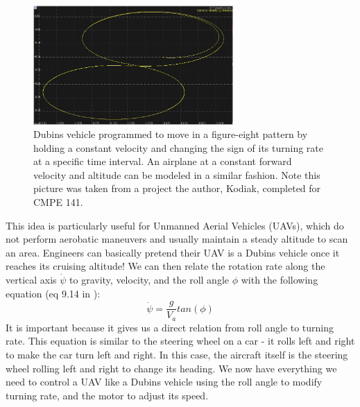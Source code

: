 \documentclass[12pt,journal,compsoc]{IEEEtran}
\begin{document}
\begin{figure}[h!]
\hspace*{0cm}
\centering
\includegraphics[width=3in]{dubins_fig8.jpg}
\caption{Dubins vehicle programmed to move in a figure-eight pattern by holding a constant velocity and changing the sign of its turning rate at a specific time interval. An airplane at a constant forward velocity and altitude can be modeled in a similar fashion. Note this picture was taken from a project the author, Kodiak, completed for CMPE 141.}
\label{f8}
\end{figure}
This idea is particularly useful for Unmanned Aerial Vehicles (UAVs), which do not perform aerobatic maneuvers and usually maintain a steady altitude to scan an area. Engineers can basically pretend their UAV is a Dubins vehicle once it reaches its cruising altitude! We can then relate the rotation rate along the vertical axis $\dot{\psi}$ to gravity, velocity, and the roll angle $\phi$ with the following equation (eq 9.14 in \cite{S-U-A}):
\[ \dot{\psi} = \frac{g}{V_a}tan(\phi) \]
It is important because it gives us a direct relation from roll angle to turning rate. This equation is similar to the steering wheel on a car - it rolls left and right to make the car turn left and right. In this case, the aircraft itself is the steering wheel rolling left and right to change its heading. We now have everything we need to control a UAV like a Dubins vehicle using the roll angle to modify turning rate, and the motor to adjust its speed.
\end{document}
